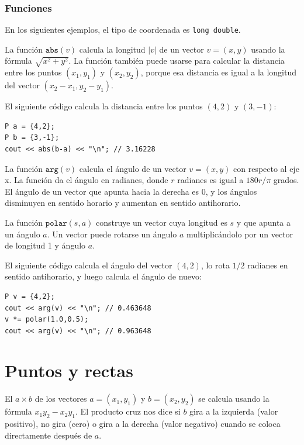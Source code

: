\subsubsection*{Funciones}

En los siguientes ejemplos, el tipo de coordenada es
\texttt{long double}.

La función $\texttt{abs}(v)$ calcula la longitud
$|v|$ de un vector $v=(x,y)$
usando la fórmula $\sqrt{x^2+y^2}$.
La función también puede usarse para
calcular la distancia entre los puntos
$(x_1,y_1)$ y $(x_2,y_2)$,
porque esa distancia es igual a la longitud
del vector $(x_2-x_1,y_2-y_1)$.

El siguiente código calcula la distancia
entre los puntos $(4,2)$ y $(3,-1)$:
\begin{lstlisting}
P a = {4,2};
P b = {3,-1};
cout << abs(b-a) << "\n"; // 3.16228
\end{lstlisting}

La función $\texttt{arg}(v)$ calcula el
ángulo de un vector $v=(x,y)$ con respecto al eje x.
La función da el ángulo en radianes,
donde $r$ radianes es igual a $180 r/\pi$ grados.
El ángulo de un vector que apunta hacia la derecha es 0,
y los ángulos disminuyen en sentido horario y aumentan
en sentido antihorario.

La función $\texttt{polar}(s,a)$ construye un vector
cuya longitud es $s$ y que apunta a un ángulo $a$.
Un vector puede rotarse un ángulo $a$
multiplicándolo por un vector de longitud 1 y ángulo $a$.

El siguiente código calcula el ángulo del
vector $(4,2)$, lo rota $1/2$ radianes
en sentido antihorario, y luego calcula el ángulo de nuevo:

\begin{lstlisting}
P v = {4,2};
cout << arg(v) << "\n"; // 0.463648
v *= polar(1.0,0.5);
cout << arg(v) << "\n"; // 0.963648
\end{lstlisting}

\section{Puntos y rectas}


El  $a \times b$ de los vectores
$a=(x_1,y_1)$ y $b=(x_2,y_2)$ se calcula
usando la fórmula $x_1 y_2 - x_2 y_1$.
El producto cruz nos dice si $b$
gira a la izquierda (valor positivo), no gira (cero)
o gira a la derecha (valor negativo)
cuando se coloca directamente después de $a$.

